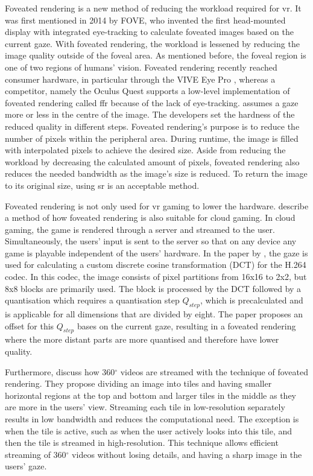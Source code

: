 Foveated rendering is a new method of reducing the workload required for \gls{vr}. It was first mentioned in 2014 by FOVE, who invented the first head-mounted display with integrated eye-tracking to calculate foveated images based on the current gaze. With foveated rendering, the workload is lessened by reducing the image quality outside of the foveal area. As mentioned before, the foveal region is one of two regions of humans' vision. Foveated rendering recently reached consumer hardware, in particular through the VIVE Eye Pro \parencite{HTCVIVEProEye2020}, whereas a competitor, namely the Oculus Quest \parencite{Quest2020} supports a low-level implementation of foveated rendering called \gls{ffr} because of the lack of eye-tracking.  assumes a gaze more or less in the centre of the image. The developers set the hardness of the reduced quality in different steps. Foveated rendering's purpose is to reduce the number of pixels within the peripheral area. During runtime, the image is filled with interpolated pixels to achieve the desired size. Aside from reducing the workload by decreasing the calculated amount of pixels, foveated rendering also reduces the needed bandwidth as the image's size is reduced. To return the image to its original size, using \gls{sr} is an acceptable method.
\par
Foveated rendering is not only used for \gls{vr} gaming to lower the hardware. \citeauthor{Illahi2020} describe a method of how foveated rendering is also suitable for cloud gaming. In cloud gaming, the game is rendered through a server and streamed to the user. Simultaneously, the users' input is sent to the server so that on any device any game is playable independent of the users' hardware. In the paper by \citeauthor{Illahi2020}, the gaze is used for calculating a custom discrete cosine transformation (DCT) for the H.264 codec. In this codec, the image consists of pixel partitions from 16x16 to 2x2, but 8x8 blocks are primarily used. The block is processed by the DCT followed by a quantisation which requires a quantisation step \(Q_{step}\), which is precalculated and is applicable for all dimensions that are divided by eight. The paper proposes an offset for this \(Q_{step}\) bases on the current gaze, resulting in a foveated rendering where the more distant parts are more quantised and therefore have lower quality. 
\par
Furthermore, \citeauthor{Guenter2016} discuss how 360$^{\circ}$ videos are streamed with the technique of foveated rendering. They propose dividing an image into tiles and having smaller horizontal regions at the top and bottom and larger tiles in the middle as they are more in the users' view. Streaming each tile in low-resolution separately results in low bandwidth and reduces the computational need. The exception is when the tile is active, such as when the user actively looks into this tile, and then the tile is streamed in high-resolution. This technique allows efficient streaming of 360$^{\circ}$ videos without losing details, and having a sharp image in the users' gaze. 


